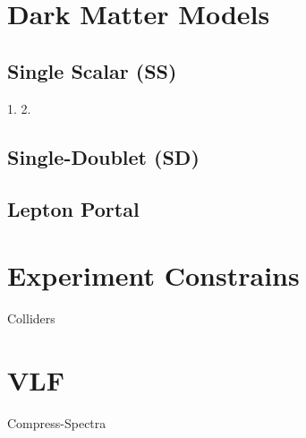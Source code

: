 \documentclass[compress,xcolor=table]{beamer}
\begin{document}
\section{Dark Matter Models}
\subsection{Single Scalar (SS)}			
\begin{frame}{}

\begin{spacing}{0.5}
	{\tiny
		1. \cite{Giacchino2013}
		2. %
	}
\end{spacing}


\end{frame}
\subsection{Single-Doublet (SD)}
\begin{frame}{}
\cite{Cohen2012}
\end{frame}
\subsection{Lepton Portal}
\begin{frame}{}
\cite{Bai2014}
\end{frame}

\section{Experiment Constrains}
\begin{frame}{}

Colliders\cite{Penning2018,Boveia2018}

\end{frame}

\section{VLF}
\begin{frame}
	\cite{Toma2013,Ibarra2014,Garny2013}
	Compress-Spectra\cite{Aaboud2018}
\end{frame}
\end{document}
